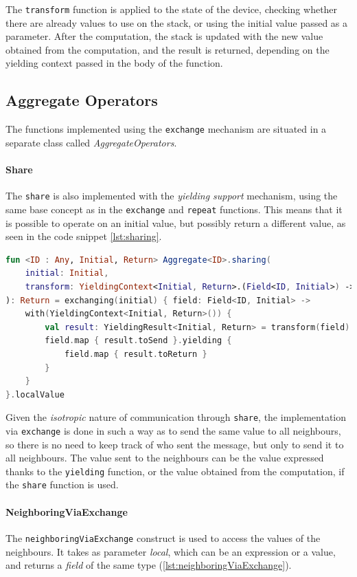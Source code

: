 The \texttt{transform} function is applied to the state of the device, checking whether there are already values to use
on the stack, or using the initial value passed as a parameter.
After the computation, the stack is updated with the new value obtained from the computation, and the result is returned,
depending on the yielding context passed in the body of the function.

\subsection{Aggregate Operators}
\label{subsec:aggregate-operators}
The functions implemented using the \texttt{exchange} mechanism are situated in a separate class called \emph{AggregateOperators}.

\paragraph{Share}
The \texttt{share} is also implemented with the \emph{yielding support} mechanism, using the same base concept as in the
\texttt{exchange} and \texttt{repeat} functions.
This means that it is possible to operate on an initial value, but possibly return a different value, as seen in the code snippet \ref{lst:sharing}.

\begin{lstlisting}[language=kt,label={lst:sharing},caption={The implementation of the \texttt{sharing} function.}]
fun <ID : Any, Initial, Return> Aggregate<ID>.sharing(
    initial: Initial,
    transform: YieldingContext<Initial, Return>.(Field<ID, Initial>) -> YieldingResult<Initial, Return>,
): Return = exchanging(initial) { field: Field<ID, Initial> ->
    with(YieldingContext<Initial, Return>()) {
        val result: YieldingResult<Initial, Return> = transform(field)
        field.map { result.toSend }.yielding {
            field.map { result.toReturn }
        }
    }
}.localValue
\end{lstlisting}

Given the \emph{isotropic} nature of communication through \texttt{share}, the implementation via \texttt{exchange} is done
in such a way as to send the same value to all neighbours, so there is no need to keep track of who sent the message,
but only to send it to all neighbours.
The value sent to the neighbours can be the value expressed thanks to the \texttt{yielding} function, or the value obtained
from the computation, if the \texttt{share} function is used.

\paragraph{NeighboringViaExchange}
The \texttt{neighboringViaExchange} construct is used to access the values of the neighbours.
It takes as parameter \emph{local}, which can be an expression or a value, and returns a \emph{field} of the same type (\ref{lst:neighboringViaExchange}).

